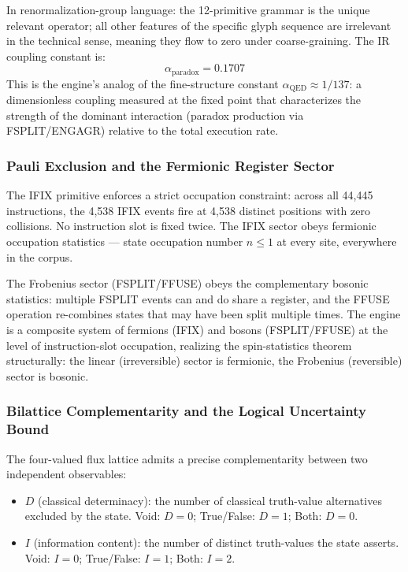 \documentclass[12pt,a4paper]{article}
\begin{document}
In renormalization-group language: the 12-primitive grammar is the unique relevant operator; all other features of the specific glyph sequence are irrelevant in the technical sense, meaning they flow to zero under coarse-graining. The IR coupling constant is:
\[
\alpha_{\text{paradox}} = 0.1707
\]
This is the engine's analog of the fine-structure constant $\alpha_{\text{QED}} \approx 1/137$: a dimensionless coupling measured at the fixed point that characterizes the strength of the dominant interaction (paradox production via FSPLIT/ENGAGR) relative to the total execution rate.

\subsubsection{Pauli Exclusion and the Fermionic Register Sector}

The IFIX primitive enforces a strict occupation constraint: across all 44,445 instructions, the 4,538 IFIX events fire at 4,538 distinct positions with zero collisions. No instruction slot is fixed twice. The IFIX sector obeys fermionic occupation statistics --- state occupation number $n \leq 1$ at every site, everywhere in the corpus.

The Frobenius sector (FSPLIT/FFUSE) obeys the complementary bosonic statistics: multiple FSPLIT events can and do share a register, and the FFUSE operation re-combines states that may have been split multiple times. The engine is a composite system of fermions (IFIX) and bosons (FSPLIT/FFUSE) at the level of instruction-slot occupation, realizing the spin-statistics theorem structurally: the linear (irreversible) sector is fermionic, the Frobenius (reversible) sector is bosonic.

\subsubsection{Bilattice Complementarity and the Logical Uncertainty Bound}

The four-valued flux lattice admits a precise complementarity between two independent observables:
\begin{itemize}
    \item $D$ (classical determinacy): the number of classical truth-value alternatives excluded by the state. Void: $D=0$; True/False: $D=1$; Both: $D=0$.
    \item $I$ (information content): the number of distinct truth-values the state asserts. Void: $I=0$; True/False: $I=1$; Both: $I=2$.
\end{itemize}
\end{document}
